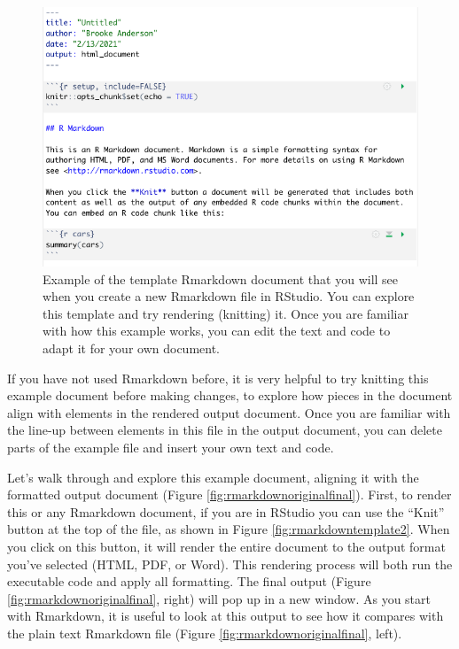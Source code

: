 \documentclass[]{tufte-book}
\begin{document}
\begin{figure}
\includegraphics[width=\textwidth]{figures/rmarkdown_template} \caption[Example of the template Rmarkdown document that you will see when you create a new Rmarkdown file in RStudio]{Example of the template Rmarkdown document that you will see when you create a new Rmarkdown file in RStudio. You can explore this template and try rendering (knitting) it. Once you are familiar with how this example works, you can edit the text and code to adapt it for your own document.}\label{fig:rmarkdowntemplate}
\end{figure}

If you have not used Rmarkdown before, it is very helpful to try knitting this
example document before making changes, to explore how pieces in the document
align with elements in the rendered output document. Once you are
familiar with the line-up between elements in this file in the output document,
you can delete parts of the example file and insert your own text and code.

Let's walk through and explore this example document, aligning it
with the formatted output document (Figure \ref{fig:rmarkdownoriginalfinal}).
First, to render this or any Rmarkdown document, if you are in RStudio you can
use the ``Knit'' button at the top of the file, as shown in Figure
\ref{fig:rmarkdowntemplate2}. When you click on this button, it will render the
entire document to the output format you've selected (HTML, PDF, or Word). This
rendering process will both run the executable code and apply all formatting.
The final output (Figure \ref{fig:rmarkdownoriginalfinal}, right) will pop up
in a new window. As you start with Rmarkdown, it is useful to look at this
output to see how it compares with the plain text Rmarkdown file (Figure
\ref{fig:rmarkdownoriginalfinal}, left).
\end{document}
